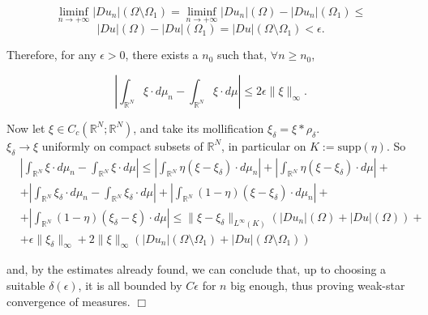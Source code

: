 \[ \liminf \limits_{n \to +\infty} |Du_{n}|(\Omega \setminus \Omega_{1}) = \liminf \limits_{n \to +\infty} |Du_{n}|(\Omega) - |Du_{n}|(\Omega_{1}) \le \]
\[ |Du|(\Omega) - |Du|(\Omega_{1}) = |Du|(\Omega \setminus \Omega_{1}) < \epsilon. \]

Therefore, for any $\epsilon > 0$, there exists a $n_{0}$ such that, $\forall n \ge n_{0}$,

\[ \left | \int_{\mathbb{R}^{N}} \xi \cdot d \mu_{n} - \int_{\mathbb{R}^{N}} \xi \cdot d \mu \right | \le 2 \epsilon \|\xi\|_{\infty}. \]

Now let $\xi \in C_{c}( \mathbb{R}^{N}; \mathbb{R}^{N})$, and take its mollification $\xi_{\delta} = \xi \ast \rho_{\delta}$. 
\\
$\xi_{\delta} \to \xi$ uniformly on compact subsets of $\mathbb{R}^{N}$, in particular on $K := \mathrm{supp}(\eta)$. So
\begin{align*} & \left | \int_{\mathbb{R}^{N}} \xi \cdot d \mu_{n} - \int_{\mathbb{R}^{N}} \xi \cdot d \mu \right | \le \left | \int_{\mathbb{R}^{N}} \eta (\xi - \xi_{\delta}) \cdot d \mu_{n} \right | + \left | \int_{\mathbb{R}^{N}} \eta (\xi -\xi_{\delta}) \cdot d \mu \right | + \\
& + \left | \int_{\mathbb{R}^{N}} \xi_{\delta} \cdot d \mu_{n} - \int_{\mathbb{R}^{N}} \xi_{\delta} \cdot d \mu \right | + \left | \int_{\mathbb{R}^{N}} (1 - \eta) (\xi - \xi_{\delta}) \cdot d \mu_{n} \right | + \\
& + \left | \int_{\mathbb{R}^{N}} (1 - \eta) (\xi_{\delta} - \xi) \cdot d \mu \right | \le \|\xi - \xi_{\delta}\|_{L^{\infty}(K)} (|Du_{n}|(\Omega) + |Du|(\Omega)) + \\
& + \epsilon \|\xi_{\delta}\|_{\infty} + 2\|\xi\|_{\infty}(|Du_{n}|(\Omega \setminus \Omega_{1}) + |Du|(\Omega \setminus \Omega_{1}) ) \end{align*}

and, by the estimates already found, we can conclude that, up to choosing a suitable $\delta(\epsilon)$, it is all bounded by $C \epsilon$ for $n$ big enough, thus proving weak-star convergence of measures. $\Box$






















